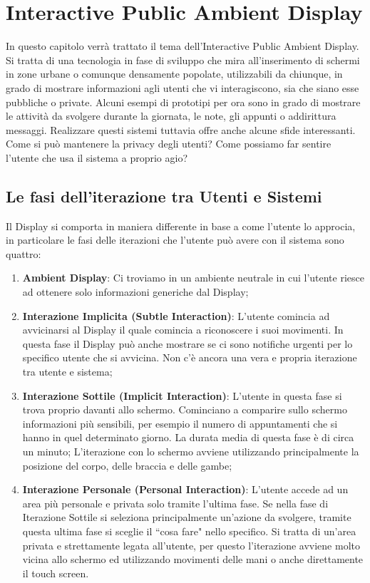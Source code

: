 \section{Interactive Public Ambient Display}
\noindent In questo capitolo verrà trattato il tema dell'Interactive Public Ambient Display.
Si tratta di una tecnologia in fase di sviluppo che mira all'inserimento di schermi in zone urbane o comunque densamente popolate, utilizzabili da chiunque, in grado di mostrare informazioni agli utenti che vi interagiscono, sia che siano esse pubbliche o private.\newline
Alcuni esempi di prototipi per ora sono in grado di mostrare le attività da svolgere durante la giornata, le note, gli appunti o addirittura messaggi.\newline
Realizzare questi sistemi tuttavia offre anche alcune sfide interessanti. Come si può mantenere la privacy degli utenti? Come possiamo far sentire l'utente che usa il sistema a proprio agio? \cite{intVideo}\newline 
\subsection{Le fasi dell'iterazione tra Utenti e Sistemi}
\noindent Il Display si comporta in maniera differente in base a come l'utente lo approcia, in particolare le fasi delle iterazioni che l'utente può avere con il sistema sono quattro:
\begin{enumerate}
    \item \textbf{Ambient Display}: Ci troviamo in un ambiente neutrale in cui l'utente riesce ad ottenere solo informazioni generiche dal Display;
    \item \textbf{Interazione Implicita (Subtle Interaction)}: L'utente comincia ad avvicinarsi al Display il quale comincia a riconoscere i suoi movimenti. In questa fase il Display può anche mostrare se ci sono notifiche urgenti per lo specifico utente che si avvicina. Non c'è ancora una vera e propria iterazione tra utente e sistema;
    \item \textbf{Interazione Sottile (Implicit Interaction)}: L'utente in questa fase si trova proprio davanti allo schermo. Cominciano a comparire sullo schermo informazioni più sensibili, per esempio il numero di appuntamenti che si hanno in quel determinato giorno. La durata media di questa fase è di circa un minuto;
    L'iterazione con lo schermo avviene utilizzando principalmente la posizione del corpo, delle braccia e delle gambe;
    \item \textbf{Interazione Personale (Personal Interaction)}: L'utente accede ad un area più personale e privata solo tramite l'ultima fase. Se nella fase di Iterazione Sottile si seleziona principalmente un'azione da svolgere, tramite questa ultima fase si sceglie il ``cosa fare" nello specifico.\newline
    Si tratta di un'area privata e strettamente legata all'utente, per questo l'iterazione avviene molto vicina allo schermo ed utilizzando movimenti delle mani o anche direttamente il touch screen.
\end{enumerate}

